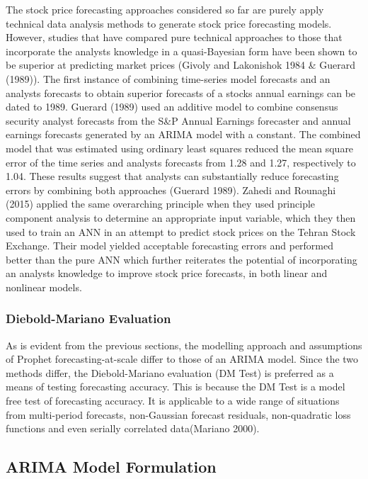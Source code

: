 \documentclass[12pt,a4paper]{article}
\numberwithin{equation}{section}
\numberwithin{figure}{section}
\numberwithin{table}{section}
\begin{document}
The stock price forecasting approaches considered so far are purely
apply technical data analysis methods to generate stock price
forecasting models. However, studies that have compared pure technical
approaches to those that incorporate the analysts knowledge in a
quasi-Bayesian form have been shown to be superior at predicting market
prices (Givoly and Lakonishok 1984 \& Guerard (1989)). The first
instance of combining time-series model forecasts and an analysts
forecasts to obtain superior forecasts of a stocks annual earnings can
be dated to 1989. Guerard (1989) used an additive model to combine
consensus security analyst forecasts from the S\&P Annual Earnings
forecaster and annual earnings forecasts generated by an ARIMA model
with a constant. The combined model that was estimated using ordinary
least squares reduced the mean square error of the time series and
analysts forecasts from 1.28 and 1.27, respectively to 1.04. These
results suggest that analysts can substantially reduce forecasting
errors by combining both approaches (Guerard 1989). Zahedi and Rounaghi
(2015) applied the same overarching principle when they used principle
component analysis to determine an appropriate input variable, which
they then used to train an ANN in an attempt to predict stock prices on
the Tehran Stock Exchange. Their model yielded acceptable forecasting
errors and performed better than the pure ANN which further reiterates
the potential of incorporating an analysts knowledge to improve stock
price forecasts, in both linear and nonlinear models.

\subsubsection{Diebold-Mariano
Evaluation}\label{diebold-mariano-evaluation}

As is evident from the previous sections, the modelling approach and
assumptions of Prophet forecasting-at-scale differ to those of an ARIMA
model. Since the two methods differ, the Diebold-Mariano evaluation (DM
Test) is preferred as a means of testing forecasting accuracy. This is
because the DM Test is a model free test of forecasting accuracy. It is
applicable to a wide range of situations from multi-period forecasts,
non-Gaussian forecast residuals, non-quadratic loss functions and even
serially correlated data(Mariano 2000).

\subsection{ARIMA Model Formulation}\label{arima-model-formulation}
\end{document}
